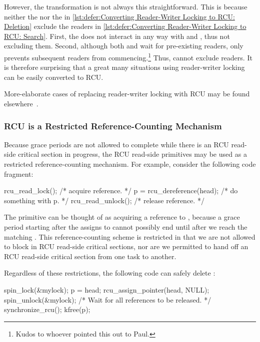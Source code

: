 However, the transformation is not always this straightforward.
This is because neither the  nor the
 in
\cref{lst:defer:Converting Reader-Writer Locking to RCU: Deletion}
exclude the readers in
\cref{lst:defer:Converting Reader-Writer Locking to RCU: Search}.
First, the  does not interact in any way with
 and , thus not excluding them.
Second, although both  and 
wait for pre-existing readers, only  prevents
subsequent readers from commencing.\footnote{
	Kudos to whoever pointed this out to Paul.}
Thus,  cannot exclude readers.
It is therefore surprising that a great many situations
using reader-writer locking can be easily converted to RCU.

More-elaborate cases of replacing reader-writer locking with RCU
may be found
elsewhere~\cite{NeilBrown2015PathnameLookup,NeilBrown2015RCUwalk}.

\subsubsection{RCU is a Restricted Reference-Counting Mechanism}
\label{sec:defer:RCU is a Restricted Reference-Counting Mechanism}

Because grace periods are not allowed to complete while
there is an RCU read-side critical section in progress,
the RCU read-side primitives may be used as a restricted
reference-counting mechanism.
For example, consider the following code fragment:

\begin{VerbatimN}
rcu_read_lock();  /* acquire reference. */
p = rcu_dereference(head);
/* do something with p. */
rcu_read_unlock();  /* release reference. */
\end{VerbatimN}

The  primitive can be thought of as
acquiring a reference to , because a grace period
starting after the  assigns to 
cannot possibly end until after we reach the matching
.
This reference-counting scheme is restricted in that
we are not allowed to block in RCU read-side critical sections,
nor are we permitted to hand off an RCU read-side critical section
from one task to another.

Regardless of these restrictions,
the following code can safely delete :

\begin{VerbatimN}
spin_lock(&mylock);
p = head;
rcu_assign_pointer(head, NULL);
spin_unlock(&mylock);
/* Wait for all references to be released. */
synchronize_rcu();
kfree(p);
\end{VerbatimN}

